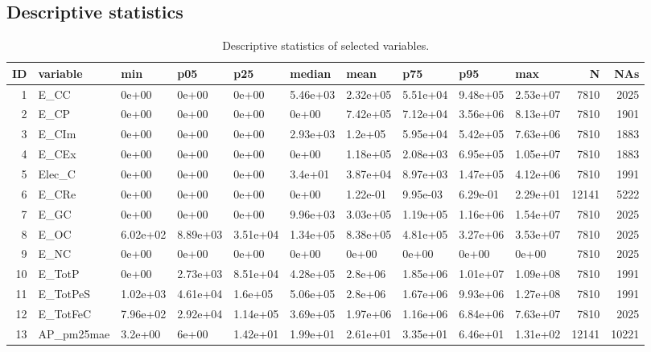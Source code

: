 \documentclass{article}\usepackage[]{graphicx}\usepackage[]{color}
\begin{document}
\subsection{Descriptive statistics}

\begin{landscape}
\tiny

\begin{longtable}[t]{r|l|l|l|l|l|l|l|l|l|r|r}
\caption{\label{tab:table_descStatSummary}Descriptive statistics of selected variables.}\\
\hline
ID & variable & min & p05 & p25 & median & mean & p75 & p95 & max & N & NAs\\
\hline
1 & E\_CC & 0e+00 & 0e+00 & 0e+00 & 5.46e+03 & 2.32e+05 & 5.51e+04 & 9.48e+05 & 2.53e+07 & 7810 & 2025\\
\hline
2 & E\_CP & 0e+00 & 0e+00 & 0e+00 & 0e+00 & 7.42e+05 & 7.12e+04 & 3.56e+06 & 8.13e+07 & 7810 & 1901\\
\hline
3 & E\_CIm & 0e+00 & 0e+00 & 0e+00 & 2.93e+03 & 1.2e+05 & 5.95e+04 & 5.42e+05 & 7.63e+06 & 7810 & 1883\\
\hline
4 & E\_CEx & 0e+00 & 0e+00 & 0e+00 & 0e+00 & 1.18e+05 & 2.08e+03 & 6.95e+05 & 1.05e+07 & 7810 & 1883\\
\hline
5 & Elec\_C & 0e+00 & 0e+00 & 0e+00 & 3.4e+01 & 3.87e+04 & 8.97e+03 & 1.47e+05 & 4.12e+06 & 7810 & 1991\\
\hline
6 & E\_CRe & 0e+00 & 0e+00 & 0e+00 & 0e+00 & 1.22e-01 & 9.95e-03 & 6.29e-01 & 2.29e+01 & 12141 & 5222\\
\hline
7 & E\_GC & 0e+00 & 0e+00 & 0e+00 & 9.96e+03 & 3.03e+05 & 1.19e+05 & 1.16e+06 & 1.54e+07 & 7810 & 2025\\
\hline
8 & E\_OC & 6.02e+02 & 8.89e+03 & 3.51e+04 & 1.34e+05 & 8.38e+05 & 4.81e+05 & 3.27e+06 & 3.53e+07 & 7810 & 2025\\
\hline
9 & E\_NC & 0e+00 & 0e+00 & 0e+00 & 0e+00 & 0e+00 & 0e+00 & 0e+00 & 0e+00 & 7810 & 2025\\
\hline
10 & E\_TotP & 0e+00 & 2.73e+03 & 8.51e+04 & 4.28e+05 & 2.8e+06 & 1.85e+06 & 1.01e+07 & 1.09e+08 & 7810 & 1991\\
\hline
11 & E\_TotPeS & 1.02e+03 & 4.61e+04 & 1.6e+05 & 5.06e+05 & 2.8e+06 & 1.67e+06 & 9.93e+06 & 1.27e+08 & 7810 & 1991\\
\hline
12 & E\_TotFeC & 7.96e+02 & 2.92e+04 & 1.14e+05 & 3.69e+05 & 1.97e+06 & 1.16e+06 & 6.84e+06 & 7.63e+07 & 7810 & 2025\\
\hline
13 & AP\_pm25mae & 3.2e+00 & 6e+00 & 1.42e+01 & 1.99e+01 & 2.61e+01 & 3.35e+01 & 6.46e+01 & 1.31e+02 & 12141 & 10221\\

\end{longtable}
\end{landscape}
\end{document}
